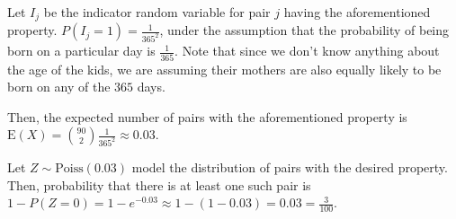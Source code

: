 Let $I_{j}$ be the indicator random variable for pair $j$ having the
aforementioned property. $P(I_{j}=1) = \frac{1}{365^{2}}$, under the assumption
that the probability of being born on a particular day is $\frac{1}{365}$. Note
that since we don't know anything about the age of the kids, we are assuming
their mothers are also equally likely to be born on any of the $365$ days.

Then, the expected number of pairs with the aforementioned property is $\text{E}
(X) = \binom{90}{2}\frac{1}{365^{2}} \approx 0.03$.

Let $Z \sim \text{Poiss}(0.03)$ model the distribution of pairs with the desired
property. Then, probability that there is at least one such pair is $1 - P(Z=0)
= 1 - e^{-0.03} \approx 1 - (1 - 0.03) = 0.03 = \frac{3}{100}$.